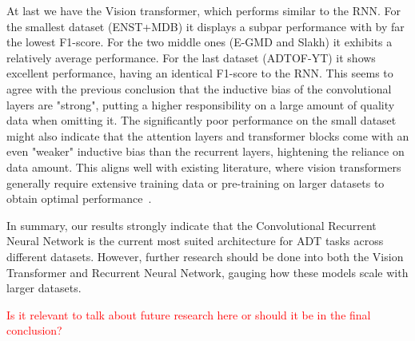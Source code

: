 At last we have the Vision transformer, which performs similar to the \gls{RNN}. For the smallest dataset (ENST+MDB) it displays a subpar performance with by far the lowest F1-score. For the two middle ones (E-GMD and Slakh) it exhibits a relatively average performance. For the last dataset (ADTOF-YT) it shows excellent performance, having an identical F1-score to the \gls{RNN}. This seems to agree with the previous conclusion that the inductive bias of the convolutional layers are "strong", putting a higher responsibility on a large amount of quality data when omitting it. The significantly poor performance on the small dataset might also indicate that the attention layers and transformer blocks come with an even "weaker" inductive bias than the recurrent layers, hightening the reliance on data amount. This aligns well with existing literature, where vision transformers generally require extensive training data or pre-training on larger datasets to obtain optimal performance~\cite{dosovitskiy2021imageworth16x16words}.

In summary, our results strongly indicate that the Convolutional Recurrent Neural Network is the current most suited architecture for \gls{ADT} tasks across different datasets. However, further research should be done into both the Vision Transformer and Recurrent Neural Network, gauging how these models scale with larger datasets.

\textcolor{red}{Is it relevant to talk about future research here or should it be in the final conclusion?}